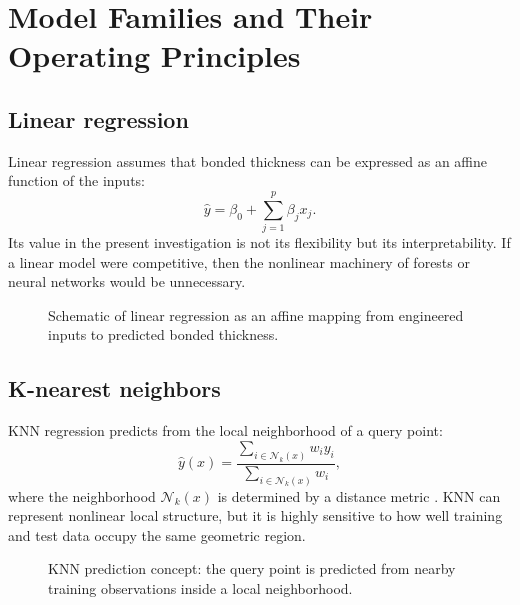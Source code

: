 \documentclass[11pt]{article}
\begin{document}
\section{Model Families and Their Operating Principles}

\subsection{Linear regression}
Linear regression assumes that bonded thickness can be expressed as an affine function of the inputs:
\begin{equation}
\hat{y} = \beta_0 + \sum_{j=1}^{p}\beta_j x_j.
\end{equation}
Its value in the present investigation is not its flexibility but its interpretability. If a linear model were competitive, then the nonlinear machinery of forests or neural networks would be unnecessary.

\begin{figure}[H]
\centering
{}
\caption{Schematic of linear regression as an affine mapping from engineered inputs to predicted bonded thickness.}
\end{figure}

\subsection{K-nearest neighbors}
KNN regression predicts from the local neighborhood of a query point:
\begin{equation}
\hat{y}(x) = \frac{\sum_{i \in \mathcal{N}_k(x)} w_i y_i}{\sum_{i \in \mathcal{N}_k(x)} w_i},
\end{equation}
where the neighborhood $\mathcal{N}_k(x)$ is determined by a distance metric \cite{aha1991}. KNN can represent nonlinear local structure, but it is highly sensitive to how well training and test data occupy the same geometric region.

\begin{figure}[H]
\centering
{}
\caption{KNN prediction concept: the query point is predicted from nearby training observations inside a local neighborhood.}
\end{figure}
\end{document}
